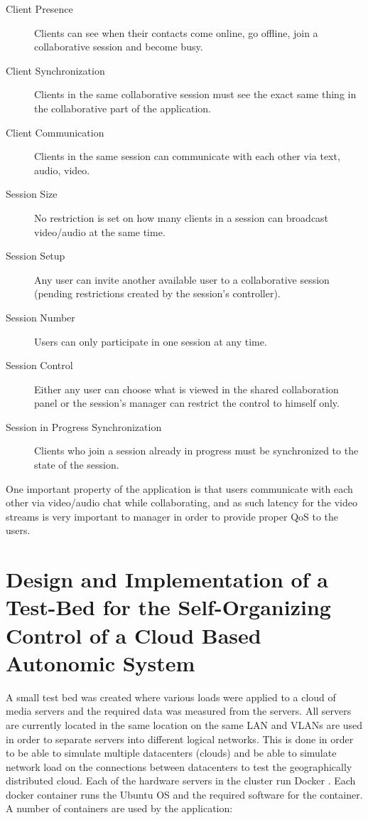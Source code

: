 \begin{description}
	\item[Client Presence] Clients can see when their contacts come online, go offline, join a collaborative session and become busy.
	\item[Client Synchronization] Clients in the same collaborative session must see the exact same thing in the collaborative part of the application.
	\item[Client Communication] Clients in the same session can communicate with each other via text, audio, video. 
	\item[Session Size] No restriction is set on how many clients in a session can broadcast video/audio at the same time.
	\item[Session Setup] Any user can invite another available user to a collaborative session (pending restrictions created by the session's controller). 
	\item[Session Number] Users can only participate in one session at any time.
	\item[Session Control] Either any user can choose what is viewed in the shared collaboration panel or the session's manager can restrict the control to himself only.
	\item[Session in Progress Synchronization] Clients who join a session already in progress must be synchronized to the state of the session.
\end{description}

One important property of the application is that users communicate with each other via video/audio chat while collaborating, and as such latency for the video streams is very important to manager in order to provide proper QoS to the users.

\section{Design and Implementation of a Test-Bed for the Self-Organizing Control of a Cloud Based Autonomic System}

A small test bed was created where various loads were applied to a cloud of media servers and the required data was measured from the servers. All servers are currently located in the same location on the same LAN and VLANs are used in order to separate servers into different logical networks. This is done in order to be able to simulate multiple datacenters (clouds) and be able to simulate network load on the connections between datacenters to test the geographically distributed cloud. Each of the hardware servers in the cluster run Docker \cite{cloud:docker}. Each docker container runs the Ubuntu OS and the required software for the container. A number of containers are used by the application:

